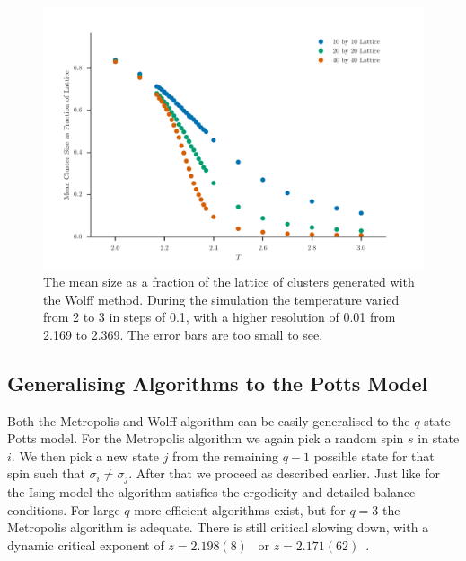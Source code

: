 \documentclass[11pt, a4paper]{report} %
\begin{document}
\begin{figure}[htb]
	\centering
	\includegraphics[width=\linewidth]{wolff_mean_cluster_size_as_fraction_of_lattice.pdf}
	\caption{The mean size as a fraction of the lattice of clusters generated with the Wolff method. During the simulation the temperature varied from 2 to 3 in steps of 0.1, with a higher resolution of 0.01 from 2.169 to 2.369. The error bars are too small to see.}
	\label{fig:wolff_cluster_size}
\end{figure}

\subsection{Generalising Algorithms to the Potts Model}
Both the Metropolis and Wolff algorithm can be easily generalised to the \(q\)-state Potts model.
For the Metropolis algorithm we again pick a random spin \(s\) in state \(i\).
We then pick a new state \(j\) from the remaining \(q-1\) possible state for that spin such that \(\sigma_i \neq \sigma_j\).
After that we proceed as described earlier.
Just like for the Ising model the algorithm satisfies the ergodicity and detailed balance conditions.
For large \(q\) more efficient algorithms exist, but for \(q=3\) the Metropolis algorithm is adequate.
There is still critical slowing down, with a dynamic critical exponent of \(z=2.198(8)\)~\cite{newman:1999} or \(z=2.171(62)\)~\cite{fan:2007}.
\end{document}
